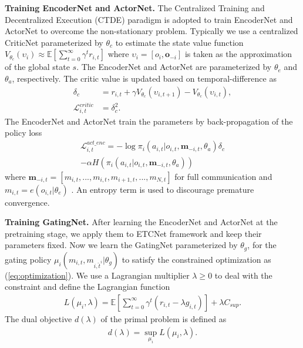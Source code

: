\documentclass[letterpaper]{article} %
\begin{document}
\textbf{Training EncoderNet and ActorNet.} The Centralized Training and Decentralized Execution (CTDE) paradigm is adopted to train EncoderNet and ActorNet to overcome the non-stationary problem.
Typically we use a centralized CriticNet parameterized by $\theta_c$ to estimate the state value function $V_{\theta_c}(\upsilon_{i}) \approx \mathbb{E}\left[ \sum_{t=0}^\infty \gamma^t r_{i,t} \right]$ where $\upsilon_{i}=[o_{i},\boldsymbol{o}_{-i}]$ is taken as the approximation of the global state $s$. The EncoderNet and ActorNet are parameterized by $\theta_e$ and $\theta_a$, respectively.
The critic value is updated based on temporal-difference as
\begin{align}
\delta_{c} & = r_{i,t} + \gamma V_{\theta_c}(\upsilon_{i,t+1}) - V_{\theta_c}(\upsilon_{i,t}), \\
\mathcal{L}_{i,t}^{critic} & =  \delta_{c}^{2}.
\end{align}
The EncoderNet and ActorNet train the parameters by back-propagation of the policy loss
\begin{multline}
\mathcal{L}_{i,t}^{act\_enc} = -\log{\pi_{i}(a_{i,t}|o_{i,t},\boldsymbol{m}_{-i,t},\theta_a)}\delta_{c}  \\
- \alpha H(\pi_{i}(a_{i,t}|o_{i,t},\boldsymbol{m}_{-i,t},\theta_a))
\end{multline}
where
$\boldsymbol{m}_{-i,t} = \left[ m_{i,t}, ..., m_{i,t}, m_{i+1,t}, ..., m_{N,t} \right]$ for full communication and $m_{i,t} = e(o_{i,t} | \theta_e)$ . An entropy term is used to discourage premature convergence.


\textbf{Training GatingNet.}
After learning the EncoderNet and ActorNet at the pretraining stage, we apply them to ETCNet framework and keep their parameters fixed. Now we learn the GatingNet parameterized by $\theta_g$, for the gating policy $\mu_{i} ( m_{i,t}, m_{i,\hat{t}^i} |\theta_g )$ to satisfy the constrained optimization as (\ref{eq:optimization}).
We use a Lagrangian multiplier $\lambda \ge 0$  to deal with the constraint and define the Lagrangian function
\begin{equation} \label{eq:lagrangian}
\begin{split}
L(\mu_{i},\lambda)=\mathbb{E}\left[ \sum_{t=0}^\infty \gamma^t (r_{i,t} -\lambda g_{i,t}) \right]+\lambda C_{sup}.
\end{split}
\end{equation}
The dual objective $d(\lambda)$ of the primal problem is defined as
\begin{equation} \label{eq:d}
\begin{split}
d(\lambda) = \sup_{\mu_{i}} L(\mu_{i},\lambda).
\end{split}
\end{equation}
\end{document}
